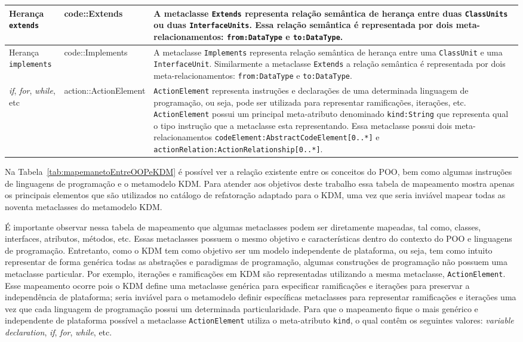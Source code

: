 \begin{center}
\begin{longtable}{ | m{1.9cm} | m{3.57cm}| m{9.3cm} | }
\hline
Herança \texttt{extends} & code::Extends & A metaclasse \texttt{Extends} representa relação semântica de herança entre duas \texttt{ClassUnits} ou duas \texttt{InterfaceUnits}. Essa relação semântica é representada por dois meta-relacionamentos: \texttt{from:DataType} e \texttt{to:DataType}.\\ 
\hline
Herança \texttt{implements} & code::Implements & A metaclasse \texttt{Implements} representa relação semântica de herança entre uma \texttt{ClassUnit} e uma \texttt{InterfaceUnit}. Similarmente a metaclasse \texttt{Extends} a relação semântica é representada por dois meta-relacionamentos: \texttt{from:DataType} e \texttt{to:DataType}.\\ 
\hline
\textit{if}, \textit{for}, \textit{while}, etc & action::ActionElement & \texttt{ActionElement} representa instruções e declarações de uma determinada linguagem de programação, ou seja, pode ser utilizada para representar ramificações, iterações, etc. \texttt{ActionElement} possui um principal meta-atributo denominado \texttt{kind:String} que representa qual o tipo instrução que a metaclasse esta representando. Essa metaclasse possui dois meta-relacionamentos \texttt{codeElement:AbstractCodeElement[0..*]} e \texttt{actionRelation:ActionRelationship[0..*]}.\\ 
\hline
\end{longtable}
\end{center}

Na Tabela~\ref{tab:mapemanetoEntreOOPeKDM} é possível ver a relação existente entre os conceitos do POO, bem como algumas instruções de linguagens de programação e o metamodelo KDM. Para atender aos objetivos deste trabalho essa tabela de mapeamento mostra apenas os principais elementos que são utilizados no catálogo de refatoração adaptado para o KDM, uma vez que seria inviável mapear todas as noventa metaclasses do metamodelo KDM.

É importante observar nessa tabela de mapeamento que algumas metaclasses podem ser diretamente mapeadas, tal como, classes, interfaces, atributos, métodos, etc. Essas metaclasses possuem o mesmo objetivo e características dentro do contexto do POO e linguagens de programação. Entretanto, como o KDM tem como objetivo ser um modelo independente de plataforma, ou seja, tem como intuito representar de forma genérica todas as abstrações e paradigmas de programação, algumas construções de programação não possuem uma metaclasse particular. Por exemplo, iterações e ramificações em KDM são representadas utilizando a mesma metaclasse, \texttt{ActionElement}. Esse mapeamento ocorre pois o KDM define uma metaclasse genérica para especificar ramificações e iterações para preservar a independência de plataforma; seria inviável para o metamodelo definir específicas metaclasses para representar ramificações e iterações uma vez que cada linguagem de programação possui um determinada particularidade. Para que o mapeamento fique o mais genérico e independente de plataforma possível a metaclasse \texttt{ActionElement} utiliza o meta-atributo \texttt{kind}, o qual contêm os seguintes valores: \textit{variable declaration}, \textit{if}, \textit{for}, \textit{while}, etc.

